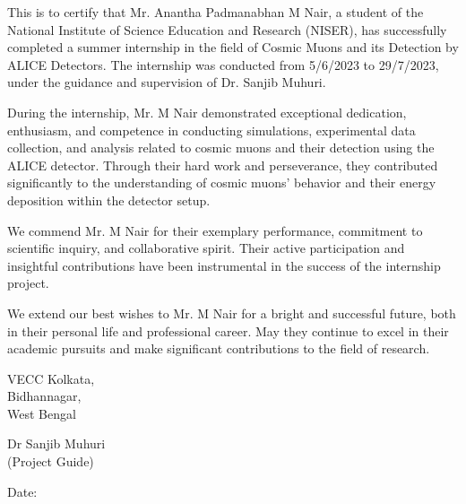 \documentclass{article}
\begin{document}
This is to certify that Mr. Anantha Padmanabhan M Nair, a 
student of the National Institute of Science Education and 
Research (NISER), has successfully completed a summer internship 
in the field of Cosmic Muons and its Detection by ALICE Detectors. 
The internship was conducted from 5/6/2023 to 29/7/2023, under the 
guidance and supervision of Dr. Sanjib Muhuri.

During the internship, Mr. M Nair demonstrated exceptional 
dedication, enthusiasm, and competence in conducting simulations, 
experimental data collection, and analysis related to cosmic muons 
and their detection using the ALICE detector. Through their hard 
work and perseverance, they contributed significantly to the 
understanding of cosmic muons' behavior and their energy deposition 
within the detector setup.

We commend Mr. M Nair for their exemplary performance, commitment 
to scientific inquiry, and collaborative spirit. 
Their active participation and insightful contributions have been 
instrumental in the success of the internship project.

We extend our best wishes to Mr. M Nair for a bright and 
successful future, both in their personal life and professional 
career. May they continue to excel in their academic pursuits and 
make significant contributions to the field of research.


\vspace{0.5cm}
\begin{flushleft}
    VECC Kolkata,\\
    Bidhannagar,\\
    West Bengal\\
\end{flushleft}




\vfill


\begin{flushright}
Dr Sanjib Muhuri\\
(Project Guide)\\
\end{flushright}
\begin{flushleft}
Date:
\end{flushleft}
\restoregeometry
\end{document}
